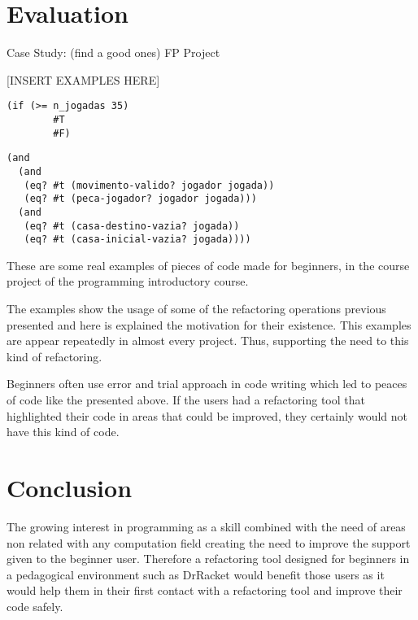 \section{Evaluation} %
Case Study: (find a good ones) FP Project

[INSERT EXAMPLES HERE]
\begin{lstlisting}[basicstyle=\ttfamily, caption="Sample code"]
  (if (>= n_jogadas 35)
        #T
        #F)
\end{lstlisting}

\begin{lstlisting}[basicstyle=\ttfamily, caption="Refactoring and expression"]
(and
  (and
   (eq? #t (movimento-valido? jogador jogada))
   (eq? #t (peca-jogador? jogador jogada)))
  (and
   (eq? #t (casa-destino-vazia? jogada))
   (eq? #t (casa-inicial-vazia? jogada))))
\end{lstlisting}


These are some real examples of pieces of code made for beginners, in the course
project of the programming introductory course.



The examples show the usage of some of the refactoring operations previous presented
and here is explained the motivation for their existence.
This examples are appear repeatedly in almost every project.
Thus, supporting the need to this kind of refactoring.

Beginners often use error and trial approach in code writing which led %
to peaces of code like the presented above.
If the users had a refactoring tool that highlighted their code in areas that
could be improved, they certainly would not have this kind of code.


\section{Conclusion}



The growing interest in programming as a skill combined with the need of areas
non related with any computation field creating the need to improve the support
given to the beginner user. %
Therefore a refactoring tool designed for beginners in a pedagogical environment such as DrRacket %
 would benefit those users as it would help them in their first contact with a
 refactoring tool and improve their code safely. %

